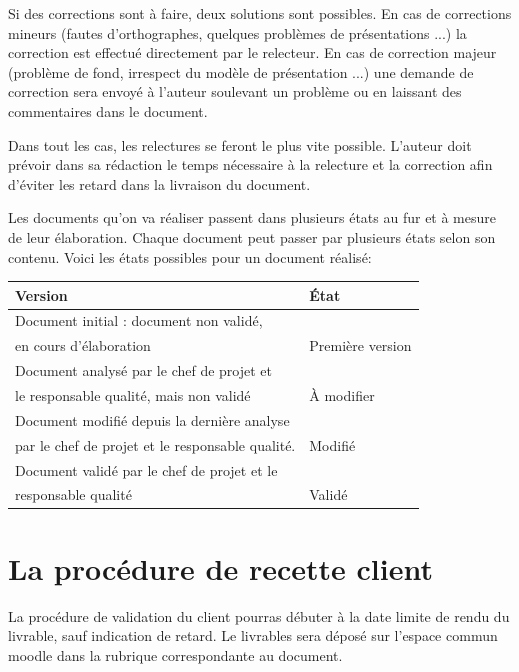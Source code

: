 Si des corrections sont à faire, deux solutions sont possibles.
En cas de corrections mineurs (fautes d’orthographes, quelques problèmes de présentations ...) la correction est effectué directement par le relecteur.
En cas de correction majeur (problème de fond, irrespect du modèle de présentation ...) une demande de correction sera envoyé à l’auteur soulevant un problème ou en laissant des commentaires dans le document.

Dans tout les cas, les relectures se feront le plus vite possible.
L’auteur doit prévoir dans sa rédaction le temps nécessaire à la relecture et la correction afin d’éviter les retard dans la livraison du document.

Les documents qu'on va réaliser passent dans plusieurs états au fur et à mesure de leur élaboration. Chaque document peut passer par plusieurs états selon son contenu. Voici les états possibles pour un document réalisé:

\begin{tabular}{ll}
    {\bf Version}                                                                                 & {\bf \'Etat}\\ \hline
    Document initial : document non validé,\\en cours d'élaboration                               & Première version \\ \hline
    Document analysé par le chef de projet et\\le responsable qualité, mais non validé            & \`A modifier \\ \hline
    Document modifié depuis la dernière analyse\\par le chef de projet et le responsable qualité. & Modifié \\ \hline
    Document validé par le chef de projet et le\\responsable qualité                              & Validé \\ \hline


\end{tabular}


\section{La procédure de recette client}

La procédure de validation du client pourras débuter à la date limite de rendu du livrable, sauf indication de retard. Le livrables sera déposé sur l'espace commun moodle dans la rubrique correspondante au document.

